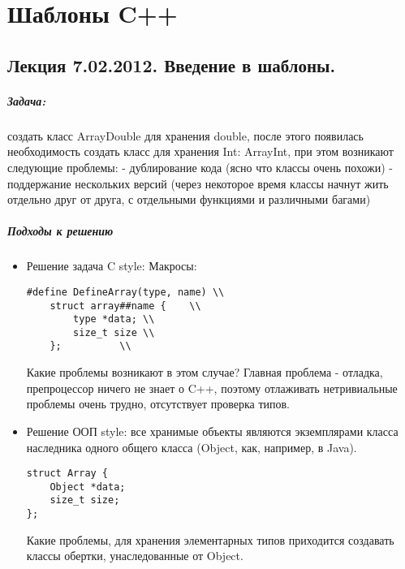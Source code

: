\chapter{Шаблоны C++}

\section{Лекция 7.02.2012. Введение в шаблоны.}

\paragraph{Задача:} создать класс ArrayDouble для хранения double, после этого появилась необходимость создать класс для хранения Int: ArrayInt, при этом возникают
следующие проблемы:
	- дублирование кода (ясно что классы очень похожи)
	- поддержание нескольких версий (через некоторое время классы начнут жить отдельно друг от друга, с отдельными функциями и различными багами)
	
\paragraph{Подходы к решению}

\begin{itemize}	
\item Решение задача C style: Макросы:
\begin{lstlisting}
#define DefineArray(type, name) \\
	struct array##name {	\\
		type *data;	\\
		size_t size	\\
	};			\\
\end{lstlisting}
	
Какие проблемы возникают в этом случае? Главная проблема - отладка, препроцессор ничего не знает о C++, поэтому отлаживать нетривиальные проблемы очень трудно,
отсутствует проверка типов.


\item Решение ООП style: все хранимые объекты являются экземплярами класса наследника одного общего класса (Object, как, например, в Java).

\begin{lstlisting}
struct Array {
	Object *data;
	size_t size;
};
\end{lstlisting}

Какие проблемы, для хранения элементарных типов приходится создавать классы обертки, унаследованные от Object.
\end{itemize}

